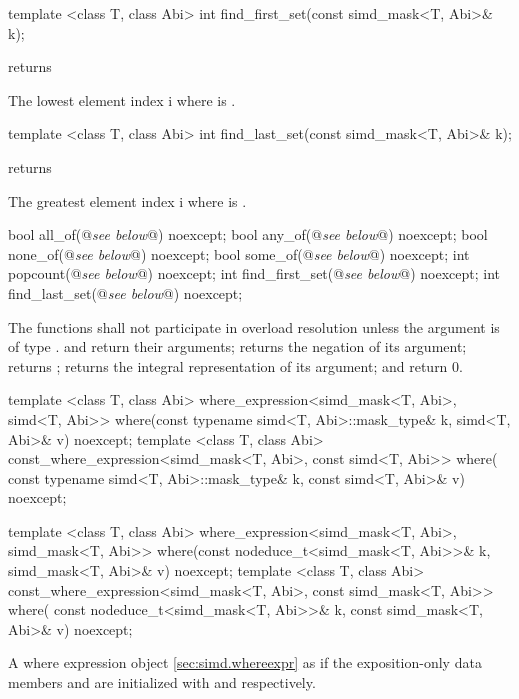 \begin{itemdecl}
template <class T, class Abi> int find_first_set(const simd_mask<T, Abi>& k);
\end{itemdecl}
\begin{itemdescr}
  \pnum\requires {} returns \true

  \pnum\returns The lowest element index \code i where  is \true.
\end{itemdescr}

\begin{itemdecl}
template <class T, class Abi> int find_last_set(const simd_mask<T, Abi>& k);
\end{itemdecl}
\begin{itemdescr}
  \pnum\requires {} returns \true

  \pnum\returns The greatest element index \code i where  is \true.
\end{itemdescr}

\begin{itemdecl}
bool  all_of(@\emph{see below}@) noexcept;
bool  any_of(@\emph{see below}@) noexcept;
bool none_of(@\emph{see below}@) noexcept;
bool some_of(@\emph{see below}@) noexcept;
int popcount(@\emph{see below}@) noexcept;
int find_first_set(@\emph{see below}@) noexcept;
int find_last_set(@\emph{see below}@) noexcept;
\end{itemdecl}
\begin{itemdescr}
  \pnum\remarks The functions shall not participate in overload resolution unless the argument is of type \bool.
  \pnum\returns {} and  return their arguments;  returns the negation of its argument;  returns \false;  returns the integral representation of its argument;  and  return 0.
\end{itemdescr}

\begin{itemdecl}
template <class T, class Abi>
where_expression<simd_mask<T, Abi>, simd<T, Abi>> where(const typename simd<T, Abi>::mask_type& k,
                                                        simd<T, Abi>& v) noexcept;
template <class T, class Abi>
const_where_expression<simd_mask<T, Abi>, const simd<T, Abi>> where(
    const typename simd<T, Abi>::mask_type& k, const simd<T, Abi>& v) noexcept;

template <class T, class Abi>
where_expression<simd_mask<T, Abi>, simd_mask<T, Abi>> where(const nodeduce_t<simd_mask<T, Abi>>& k,
                                                             simd_mask<T, Abi>& v) noexcept;
template <class T, class Abi>
const_where_expression<simd_mask<T, Abi>, const simd_mask<T, Abi>> where(
    const nodeduce_t<simd_mask<T, Abi>>& k, const simd_mask<T, Abi>& v) noexcept;
\end{itemdecl}
\begin{itemdescr}
  \pnum\returns A where expression object \ref{sec:simd.whereexpr} as if the exposition-only data members  and  are initialized with  and  respectively.
\end{itemdescr}

